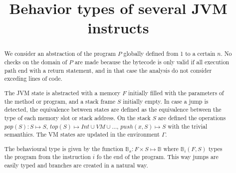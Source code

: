 \documentclass{amsart}
\newcommand{\bFunc}{\mathbb{B}}
\numberwithin{equation}{section}
\theoremstyle{plain} %
\theoremstyle{definition}
\theoremstyle{remark}
\begin{document}
\title{Behavior types of several JVM instructs}



\maketitle


\begin{abstract}
We consider an abstraction of the program $P$ globally defined from 1 to a certain $n$. No checks on the domain of $P$ are made because the bytecode is only valid if all execution path end with a return statement, and in that case the analysis do not consider exceding lines of code.

The JVM state is abstracted with a memory $F$ initially filled with the parameters of the method or program, and a stack frame $S$ initially empty. In case a jump is detected, the equivalence between states are defined as the equivalence between the type of each memory slot or stack address. On the stack $S$ are defined the operations $pop(S): S \mapsto S$, $top(S) \mapsto Int \cup VM \cup \dots$, $push(x, S) \mapsto S$ with the trivial semanthics. The VM states are updated in the environment $\Gamma$.

The behavioural type is given by the function $\bFunc{}_x:F \times S \mapsto \mathbb{B}$ where $\bFunc{}_i(F, S)$ types the program from the instruction $i$ fo the end of the program. This way jumps are easily typed and branches are created in a natural way.


\end{abstract}
\end{document}
